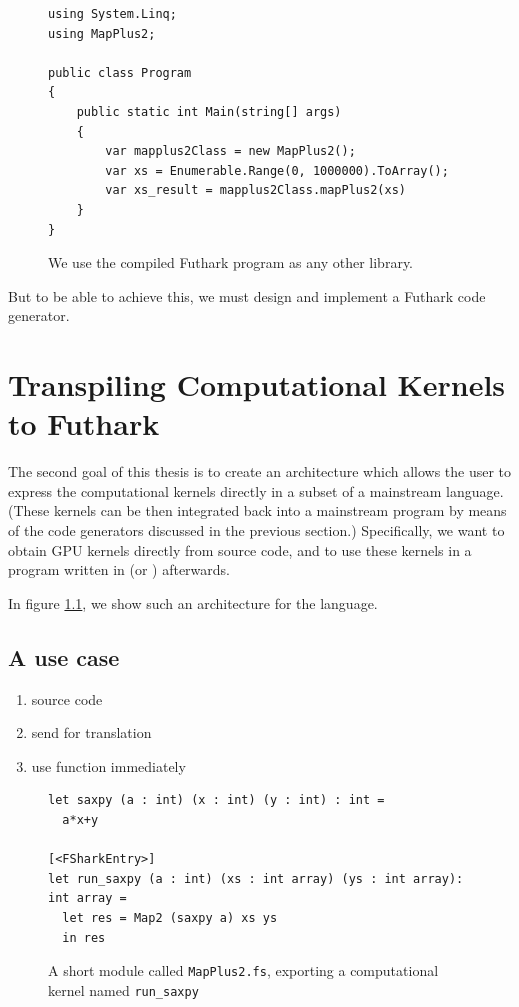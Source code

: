 \begin{figure}[H]
  \centering
\begin{verbatim}
using System.Linq;
using MapPlus2;

public class Program
{
    public static int Main(string[] args)
    {
        var mapplus2Class = new MapPlus2();
        var xs = Enumerable.Range(0, 1000000).ToArray();
        var xs_result = mapplus2Class.mapPlus2(xs)
    }
}
\end{verbatim}
  \caption{We use the compiled Futhark program as any other library.}
  \label{fig:shortfutharkprogram5}
\end{figure}

But to be able to achieve this, we must design and implement a Futhark \csharp{}
code generator.

\section{Transpiling \fsharp{} Computational Kernels to Futhark}

The second goal of this thesis is to create an architecture which allows the
user to express the computational kernels directly in a subset of a mainstream
language. (These kernels can be then integrated back into a mainstream 
program by means of the code generators discussed in the previous section.)
Specifically, we want to obtain GPU kernels directly from \fsharp{} source 
code, and to use these kernels in a program written in \fsharp{} (or \csharp{}) 
afterwards.

In figure \ref{}, we show such an architecture for the \fsharp{} language.

\subsection{A use case}
\begin{enumerate}
\item  source code
\item  send for translation
\item  use function immediately
\end{enumerate}

\begin{figure}[h]
  \centering
\begin{verbatim}
let saxpy (a : int) (x : int) (y : int) : int =
  a*x+y
  
[<FSharkEntry>]
let run_saxpy (a : int) (xs : int array) (ys : int array): int array =
  let res = Map2 (saxpy a) xs ys
  in res
\end{verbatim}
\caption{A short \fshark{} module called {\tt MapPlus2.fs}, exporting a computational kernel named {\tt run\_saxpy}}
\label{fig:shortfsharkprogram0}
\end{figure}



